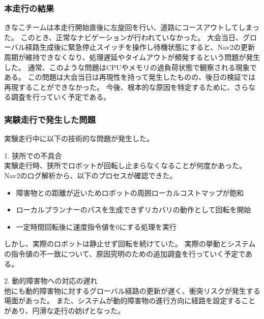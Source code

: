 \subsubsection{本走行の結果}
きなこチームは本走行開始直後に左旋回を行い、道路にコースアウトしてしまった。
このとき、正常なナビゲーションが行われていなかった。
大会当日、グローバル経路生成後に緊急停止スイッチを操作し待機状態にすると、Nav2の更新周期が維持できなくなり、処理遅延やタイムアウトが頻発するという問題が発生した。
通常、このような問題はCPUやメモリの過負荷状態で観察される現象である。
この問題は大会当日は再現性を持って発生したものの、後日の検証では再現することができなかった。
今後、根本的な原因を特定するために、さらなる調査を行っていく予定である。

\subsubsection{実験走行で発生した問題}
実験走行中に以下の技術的な問題が発生した。

1. 狭所での不具合\\
実験走行時、狭所でロボットが回転し止まらなくなることが何度かあった。
Nav2のログ解析から、以下のプロセスが確認できた。

\begin{itemize}
  \item 障害物との距離が近いためロボットの周囲ローカルコストマップが飽和
  \item ローカルプランナーのパスを生成できずリカバリの動作として回転を開始
  \item  一定時間回転後に速度指令値を0にする処理を実行
\end{itemize}

しかし、実際のロボットは静止せず回転を続けていた。
実際の挙動とシステムの指令値の不一致について、原因究明のための追加調査を行っていく予定である。

2. 動的障害物への対応の遅れ\\
他にも動的障害物に対するグローバル経路の更新が遅く、衝突リスクが発生する場面があった。
また、システムが動的障害物の進行方向に経路を設定することがあり、円滑な走行の妨げとなった。
